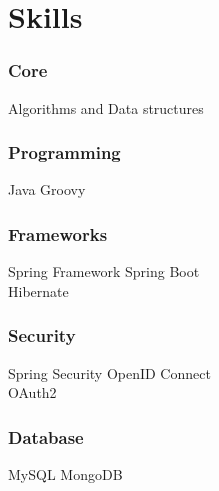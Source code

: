 \documentclass[]{resume}
\begin{document}
    \lastupdated



    \begin{minipage}[t]{0.33\textwidth}


        \section{Skills}\label{sec:skills}
        \subsubsection{Core}
        \textbullet{} Algorithms and Data structures\\
        \subsubsection{Programming}
        \textbullet{} Java \textbullet{} Groovy\\
        \subsubsection{Frameworks}
        \textbullet{} Spring Framework \textbullet{} Spring Boot\\
        \textbullet{} Hibernate\\
        \subsubsection{Security}
        \textbullet{} Spring Security \textbullet{} OpenID Connect\\
        \textbullet{} OAuth2\\
        \subsubsection{Database}
        \textbullet{} MySQL \textbullet{} MongoDB\\

\end{minipage}
\end{document}
